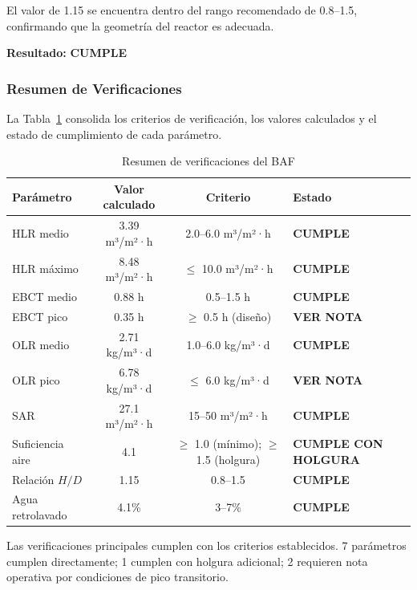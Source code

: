 El valor de 1.15 se encuentra dentro del rango recomendado de 0.8--1.5, confirmando que la geometría del reactor es adecuada.

\textbf{Resultado:} \textbf{CUMPLE}

\subsubsection*{Resumen de Verificaciones}

La Tabla~\ref{tab:verif_baf} consolida los criterios de verificación, los valores calculados y el estado de cumplimiento de cada parámetro.

\begin{table}[H]
\centering
\caption{Resumen de verificaciones del BAF}
\label{tab:verif_baf}
\begin{tabular}{lccl}
\toprule
\textbf{Parámetro} & \textbf{Valor calculado} & \textbf{Criterio} & \textbf{Estado} \\
\midrule
HLR medio        & 3.39 m³/m²·h   & 2.0--6.0 m³/m²·h  & \textbf{CUMPLE} \\
HLR máximo       & 8.48 m³/m²·h   & $\leq$ 10.0 m³/m²·h             & \textbf{CUMPLE} \\
EBCT medio       & 0.88 h                   & 0.5--1.5 h                   & \textbf{CUMPLE} \\
EBCT pico        & 0.35 h              & $\geq$ 0.5 h (diseño)             & \textbf{VER NOTA} \\
OLR medio        & 2.71 kg/m³·d   & 1.0--6.0 kg/m³·d & \textbf{CUMPLE} \\
OLR pico         & 6.78 kg/m³·d & $\leq$ 6.0 kg/m³·d          & \textbf{VER NOTA} \\
SAR              & 27.1 m³/m²·h       & 15--50 m³/m²·h  & \textbf{CUMPLE} \\
Suficiencia aire & 4.1      & $\geq$ 1.0 (mínimo); $\geq$ 1.5 (holgura)  & \textbf{CUMPLE CON HOLGURA} \\
Relación $H/D$   & 1.15               & 0.8--1.5          & \textbf{CUMPLE} \\
Agua retrolavado & 4.1\%          & 3--7\%  & \textbf{CUMPLE} \\
\bottomrule
\end{tabular}
\end{table}

Las verificaciones principales cumplen con los criterios establecidos. 7 parámetros cumplen directamente; 1 cumplen con holgura adicional; 2 requieren nota operativa por condiciones de pico transitorio.

